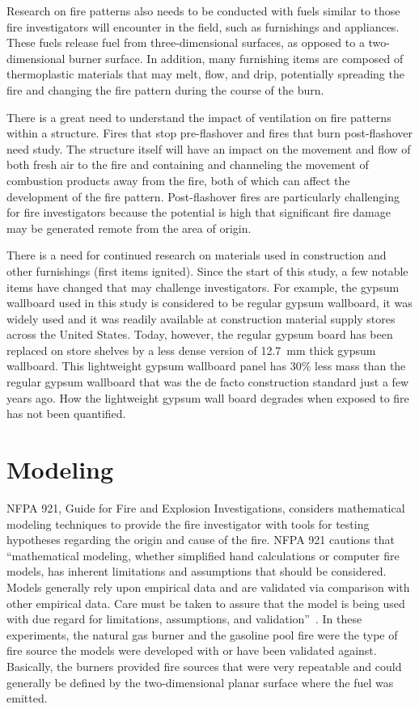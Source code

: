 \documentclass[twoside]{uocthesis}
\begin{document}
{Research on fire patterns also needs to be conducted with fuels similar to those fire investigators will encounter in the field, such as furnishings and appliances. 
These fuels release fuel from three-dimensional surfaces, as opposed to a two-dimensional burner surface.  In addition, many furnishing items are composed of thermoplastic materials that may melt, flow, and drip, potentially spreading the fire and changing the fire pattern during the course of the burn.

There is a great need to understand the impact of ventilation on fire patterns within a structure.  Fires that stop pre-flashover and fires that burn post-flashover need study.  The structure itself will have an impact on the movement and flow of both fresh air to the fire and containing and channeling the movement of combustion products away from the fire, both of which can affect the development of the fire pattern.  Post-flashover fires are particularly challenging for fire investigators because the potential is high that significant fire damage may be generated remote from the area of origin.  

There is a need for continued research on materials used in construction and other furnishings (first items ignited).  Since the start of this study, a few notable items have changed that may challenge investigators.  For example, the gypsum wallboard used in this study is considered to be regular gypsum wallboard, it was widely used and it was readily available at construction material supply stores across the United States.  Today, however, the regular gypsum board has been replaced on store shelves by a less dense version of 12.7~mm thick gypsum wallboard.  This lightweight gypsum wallboard panel has 30\% less mass than the regular gypsum wallboard that was the de facto construction standard just a few years ago.  How the lightweight gypsum wall board degrades when exposed to fire has not been quantified.    

\section{Modeling}
          
NFPA 921, Guide for Fire and Explosion Investigations, considers mathematical modeling techniques to provide the fire investigator with tools for testing hypotheses regarding the origin and cause of the fire.  NFPA 921 cautions that ``mathematical modeling, whether simplified hand calculations or computer fire models, has inherent limitations and assumptions that should be considered. Models generally rely upon empirical data and are validated via comparison with other empirical data. Care must be taken to assure that the model is being used with due regard for limitations, assumptions, and validation''~\cite{NFPA:921}.  In these experiments, the natural gas burner and the gasoline pool fire were the type of fire source the models were developed with or have been validated against.  Basically, the burners provided fire sources that were very repeatable and could generally be defined by the two-dimensional planar surface where the fuel was emitted.  

}
\end{document}
